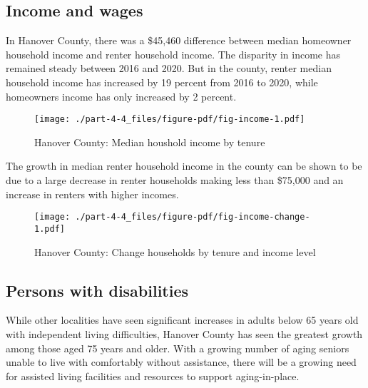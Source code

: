 \documentclass[
  letterpaper,
  DIV=11,
  numbers=noendperiod]{scrreprt}
\begin{document}
\hypertarget{income-and-wages-3}{%
\subsection{Income and wages}\label{income-and-wages-3}}

In Hanover County, there was a \$45,460 difference between median
homeowner household income and renter household income. The disparity in
income has remained steady between 2016 and 2020. But in the county,
renter median household income has increased by 19 percent from 2016 to
2020, while homeowners income has only increased by 2 percent.

\begin{figure}

{\centering \texttt{[image: ./part-4-4\_files/figure-pdf/fig-income-1.pdf]}

}

\caption{\label{fig-income}Hanover County: Median houshold income by
tenure}

\end{figure}

The growth in median renter household income in the county can be shown
to be due to a large decrease in renter households making less than
\$75,000 and an increase in renters with higher incomes.

\begin{figure}

{\centering \texttt{[image: ./part-4-4\_files/figure-pdf/fig-income-change-1.pdf]}

}

\caption{\label{fig-income-change}Hanover County: Change households by
tenure and income level}

\end{figure}

\hypertarget{persons-with-disabilities-3}{%
\subsection{Persons with
disabilities}\label{persons-with-disabilities-3}}

While other localities have seen significant increases in adults below
65 years old with independent living difficulties, Hanover County has
seen the greatest growth among those aged 75 years and older. With a
growing number of aging seniors unable to live with comfortably without
assistance, there will be a growing need for assisted living facilities
and resources to support aging-in-place.
\end{document}
